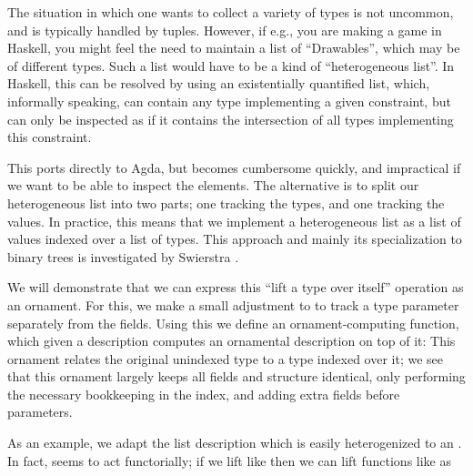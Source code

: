 The situation in which one wants to collect a variety of types is not uncommon, and is typically handled by tuples. However, if e.g., you are making a game in Haskell, you might feel the need to maintain a list of ``Drawables'', which may be of different types. Such a list would have to be a kind of ``heterogeneous list''. In Haskell, this can be resolved by using an existentially quantified list, which, informally speaking, can contain any type implementing a given constraint, but can only be inspected as if it contains the intersection of all types implementing this constraint. 

This ports directly to Agda, but becomes cumbersome quickly, and impractical if we want to be able to inspect the elements. The alternative is to split our heterogeneous list into two parts; one tracking the types, and one tracking the values. In practice, this means that we implement a heterogeneous list as a list of values indexed over a list of types. This approach and mainly its specialization to binary trees is investigated by Swierstra \cite{hetbin}.

We will demonstrate that we can express this ``lift a type over itself'' operation as an ornament. For this, we make a small adjustment to  to track a type parameter separately from the fields. Using this we define an ornament-computing function, which given a description computes an ornamental description on top of it:
This ornament relates the original unindexed type to a type indexed over it; we see that this ornament largely keeps all fields and structure identical, only performing the necessary bookkeeping in the index, and adding extra fields before parameters.

As an example, we adapt the list description
which is easily heterogenized to an . In fact,  seems to act functorially; if we lift  like
then we can lift functions like  as
